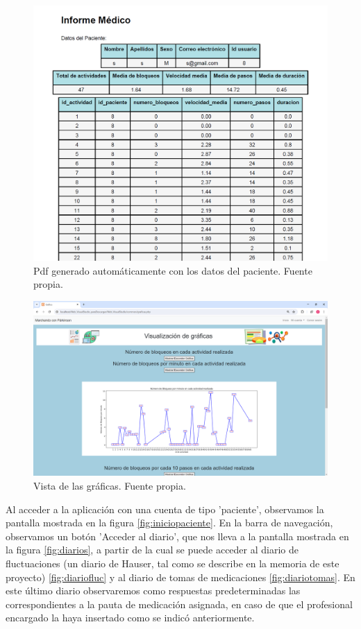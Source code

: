 \begin{figure}[h]
    \centering
    \includegraphics[width=1\textwidth]{img/pdf.png}
    \caption{Pdf generado automáticamente con los datos del paciente. Fuente propia.}
    \label{fig:pdf}
\end{figure}

\begin{figure}[h]
    \centering
    \includegraphics[width=1\textwidth]{img/graficas.png}
    \caption{Vista de las gráficas. Fuente propia.}
    \label{fig:graficas}
\end{figure}

Al acceder a la aplicación con una cuenta de tipo 'paciente', observamos la pantalla mostrada en la figura \ref{fig:iniciopaciente}. En la barra de navegación, observamos un botón 'Acceder al diario', que nos lleva a la pantalla mostrada en la figura \ref{fig:diarios}, a partir de la cual se puede acceder al diario de fluctuaciones (un diario de Hauser, tal como se describe en la memoria de este proyecto) \ref{fig:diariofluc} y al diario de tomas de medicaciones \ref{fig:diariotomas}. En este último diario observaremos como respuestas predeterminadas las correspondientes a la pauta de medicación asignada, en caso de que el profesional encargado la haya insertado como se indicó anteriormente.

